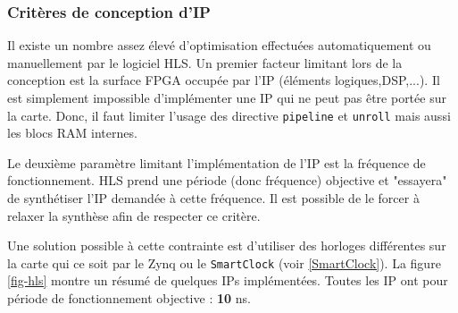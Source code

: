 \documentclass[12pt,a4paper]{article}
\begin{document}
\subsubsection{Critères de conception d'IP}
Il existe un nombre assez élevé d'optimisation effectuées automatiquement ou manuellement par le logiciel HLS. Un premier facteur limitant lors de la conception est la surface FPGA occupée par l'IP (éléments logiques,DSP,...). Il est simplement impossible d'implémenter une IP qui ne peut pas être portée sur la carte. Donc, il faut limiter l'usage des directive \texttt{pipeline} et \texttt{unroll} mais aussi les blocs RAM internes.

Le deuxième paramètre limitant l'implémentation de l'IP est la fréquence de fonctionnement. HLS prend une période (donc fréquence) objective et "essayera" de synthétiser l'IP demandée à cette fréquence. Il est possible de le forcer à relaxer la synthèse afin de respecter ce critère.

Une solution possible à cette contrainte est d'utiliser des horloges différentes sur la carte qui ce soit par le Zynq ou le \texttt{SmartClock} (voir \ref{SmartClock}). La figure \ref{fig-hls} montre un résumé de quelques IPs implémentées. Toutes les IP ont pour période de fonctionnement objective : \textbf{10} ns.
\end{document}
